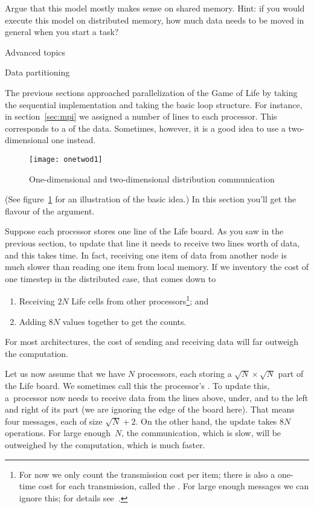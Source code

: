 \begin{exercise}
  Argue that this model mostly makes sense on shared memory. Hint: if
  you would execute this model on distributed memory, how much data
  needs to be moved in general when you start a task?
\end{exercise}

 {Advanced topics}

 {Data partitioning}
\label{sec:distribution}

The previous sections approached parallelization of the
Game of Life by taking the sequential implementation
and taking the basic loop structure. For instance, in
section~\ref{sec:mpi} we assigned a number of lines to each 
processor. This corresponds to a 
of the data.
Sometimes, however, it is a good idea to use a two-dimensional
one instead.
\begin{figure}[ht]
  \texttt{[image: onetwod1]}
  \caption{One-dimensional and two-dimensional distribution communication}
  \label{fig:onetwod1}
\end{figure}
(See figure~\ref{fig:onetwod1} for an illustration 
of the basic idea.) In this section you'll get the
flavour of the argument.

Suppose each processor stores one line of the Life board. 
As you saw in the previous section, to update that line it needs to receive
two lines worth of data, and this takes time.
In fact, receiving one item of data from another node is much slower
than reading one item from local memory. If we inventory the cost 
of one timestep in the distributed case, that comes down to
\begin{enumerate}
\item Receiving $2N$ Life cells from other processors\footnote{For now
  we only count the transmission cost per item; there is also a
  one-time cost for each transmission, called the . For large enough messages we
  can ignore this; for details see~.}; and
\item Adding $8N$ values together to get the counts.
\end{enumerate}
For most architectures, the cost of sending and receiving data will
far outweigh the computation.

Let us now assume that we have $N$ processors, each storing a $\sqrt
N\times\sqrt N$ part of the Life board. We sometimes call this 
the processor's .
To update this, a~processor
now needs to receive data from the lines above, under, and to the left
and right of its part (we are ignoring the edge of the board here).
That means four messages, each of size $\sqrt N+2$.
On the other hand, the update takes $8N$ operations. For large enough~$N$,
the communication, which is slow, will be outweighed by the computation,
which is much faster.

